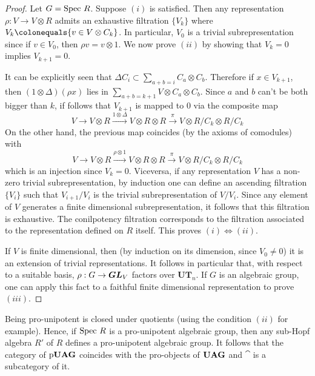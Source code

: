 \begin{proof}
Let $G=\mathrm{Spec}~ R$. Suppose $(i)$ is satisfied. Then any representation $\rho: V\to V\otimes R$ admits an exhaustive filtration $\{V_k\}$ where $V_k\colonequals\{v\in V\otimes C_k\}$. In particular, $V_0$ is a trivial subrepresentation since if $v\in V_0$, then $\rho v=v\otimes1$. We now prove $(ii)$ by showing that $V_k=0$ implies $V_{k+1}=0$.

It can be explicitly seen that $\Delta C_i\subset\sum_{a+b=i} C_a\otimes C_{b}$. Therefore if $x\in V_{k+1}$, then $(1\otimes\Delta)(\rho x)$ lies in $\sum_{a+b=k+1} V\otimes C_{a}\otimes C_{b}$. Since $a$ and $b$ can't be both bigger than $k$, if follows that $V_{k+1}$ is mapped to $0$ via the composite map
\[
V\to V\otimes R\stackrel{1\otimes\Delta}{\rightarrow}V\otimes R\otimes R\stackrel{\pi}{\rightarrow}V\otimes R/C_k\otimes R/C_k
\]
On the other hand, the previous map coincides (by the axioms of comodules) with
\[
V\to V\otimes R\stackrel{\rho\otimes1}{\rightarrow}V\otimes R\otimes R\stackrel{\pi}{\rightarrow}V\otimes R/C_k\otimes R/C_k
\]
which is an injection since $V_k=0$. Viceversa, if any representation $V$ has a non-zero trivial subrepresentation, by induction one can define an ascending filtration $\{V_i\}$ such that $V_{i+1}/V_{i}$ is the trivial subrepresentation of $V/V_i$. Since any element of $V$ generates a finite dimensional subrepresentation, it follows that this filtration is exhaustive. The conilpotency filtration corresponds to the filtration associated to the representation defined on $R$ itself. This proves $(i)\Leftrightarrow(ii)$.

If $V$ is finite dimensional, then (by induction on its dimension, since $V_0\neq0$) it is an extension of trivial representations. It follows in particular that, with respect to a suitable basis, $\rho: G\to\boldsymbol{GL}_V$ factors over $\mathbf{UT}_n$. If $G$ is an algebraic group, one can apply this fact to a faithful finite dimensional representation to prove $(iii)$.
\end{proof}

Being pro-unipotent is closed under quotients (using the condition $(ii)$ for example). Hence, if $\mathrm{Spec}~ R$ is a pro-unipotent algebraic group, then any sub-Hopf algebra $R'$ of $R$ defines a pro-unipotent algebraic group. It follows that the category of $\operatorname{p\bf{UAG}}$ coincides with the pro-objects of $\operatorname{\bf{UAG}}$ and $\cat$ is a subcategory of it.%

